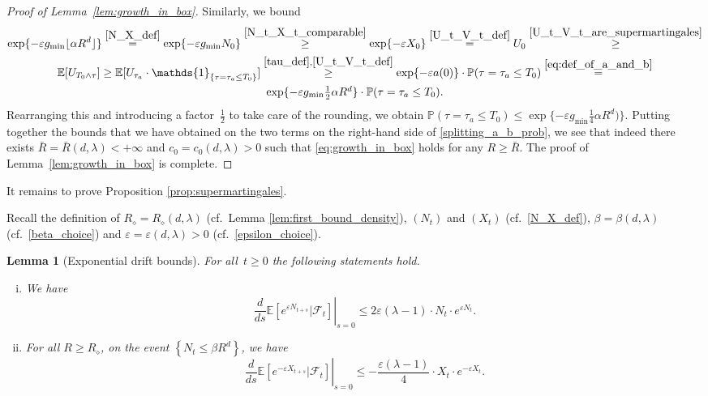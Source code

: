 \documentclass[a4paper,12pt]{article}
\newtheorem  {lemma}         [theorem]{Lemma}
\begin{document}
\begin{proof}[Proof of Lemma~\ref{lem:growth_in_box}]
Similarly, we bound
\begin{multline*}
\exp\{-\varepsilon g_{\min} \lfloor \alpha R^d\rfloor \}\stackrel{ \eqref{N_X_def} }{=}\exp\{-\varepsilon g_{\min} N_0 \}
\stackrel{ \eqref{N_t_X_t_comparable} }{\geq }  \exp\{-\varepsilon  X_0 \}
 \stackrel{ \eqref{U_t_V_t_def} }{=} U_0 \stackrel{ \eqref{U_t_V_t_are_supermartingales} }{\geq}
 \\
  \mathbb{E}[U_{{T_0} \wedge \tau}]
 \geq \mathbb{E}[U_{\tau_a} \cdot \mathds{1}_{\{\tau = \tau_a \le {T_0}\}}] \stackrel{ \eqref{tau_def}, \eqref{U_t_V_t_def} }{\geq} \exp\{-\varepsilon a(0)\} \cdot \mathbb{P}(\tau = \tau_a \le {T_0}) \stackrel{ \eqref{eq:def_of_a_and_b} }{=} \\
  \exp\{-\varepsilon g_{\min} \textstyle{\frac{1}{2}} \alpha R^d  \} \cdot \mathbb{P}(\tau = \tau_a \le {T_0}).
\end{multline*}
Rearranging this and introducing a factor~$\tfrac12$ to take care of the rounding, we obtain $\mathbb{P}(\tau = \tau_a \le {T_0})\leq  \exp\{-\varepsilon g_{\min} \frac14\alpha R^d)  \}$.
Putting together the bounds that we have obtained on the two terms on the right-hand side of \eqref{splitting_a_b_prob}, we see that indeed there exists
$\bar{R}=\bar{R}(d,\lambda)<+\infty$ and $c_0=c_0(d,\lambda)>0$ such that \eqref{eq:growth_in_box} holds for any $R \geq \bar{R}$. The proof of
Lemma~\ref{lem:growth_in_box} is complete.
\end{proof}

It remains to prove  Proposition \ref{prop:supermartingales}.

Recall the definition of $R_\diamond=R_\diamond(d,\lambda)$ (cf.\ Lemma \ref{lem:first_bound_density}), $(N_t)$ and $(X_t)$ (cf.\ \eqref{N_X_def}), $\beta=\beta(d,\lambda)$ (cf.\ \eqref{beta_choice}) and $\varepsilon=\varepsilon(d,\lambda)> 0$ (cf.\ \eqref{epsilon_choice}).
\begin{lemma}[Exponential drift bounds] \label{lem:for_supermartingale}
For all~$t \geq 0$ the following statements hold.
\begin{enumerate}[(i)]
\item  We have
\begin{equation}\label{eq:bound_for_exp_N}
\left. \frac{d}{ds} \mathbb{E}\left[ e^{\varepsilon N_{t+s}} | \mathscr{F}_t\right] \right|_{s = 0} \leq 2 \varepsilon (\lambda - 1)\cdot  N_t \cdot e^{\varepsilon N_t}.
\end{equation}
\item For all $R \geq R_\diamond$, on the event
$\left\{ N_t \leq \beta R^d \right\}$,  we have
\begin{equation}\label{eq:bound_for_exp_X}
\left. \frac{d}{ds} \mathbb{E}\left[ e^{- \varepsilon X_{t+s}} | \mathscr{F}_t\right] \right|_{s = 0}  \leq -\frac{\varepsilon (\lambda - 1)}{4}\cdot X_t \cdot e^{-\varepsilon X_t}.
\end{equation}
\end{enumerate}
\end{lemma}
\end{document}
